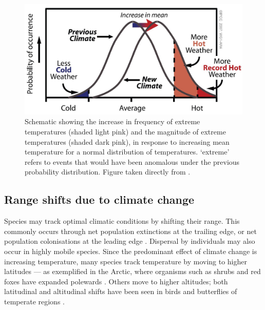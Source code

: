 \documentclass[12pt,a4paper,]{report}
\theoremstyle{definition}
\theoremstyle{definition}
\theoremstyle{definition}
\theoremstyle{remark}
\begin{document}
\begin{figure}
\centering
\includegraphics{figs/Fig1.1.jpg}
\caption{\label{fig:fig-1-1}Schematic showing the increase in frequency of extreme
temperatures (shaded light pink) and the magnitude of extreme
temperatures (shaded dark pink), in response to increasing mean
temperature for a normal distribution of temperatures. `extreme' refers
to events that would have been anomalous under the previous probability
distribution. Figure taken directly from \citet{ipcc_climate2007}.}
\end{figure}

\subsection{Range shifts due to climate
change}\label{range-shifts-due-to-climate-change}

Species may track optimal climatic conditions by shifting their range.
This commonly occurs through net population extinctions at the trailing
edge, or net population colonisations at the leading edge
\citep{parmesan_poleward1999}. Dispersal by individuals may also occur
in highly mobile species. Since the predominant effect of climate change
is increasing temperature, many species track temperature by moving to
higher latitudes --- as exemplified in the Arctic, where organisms such
as shrubs and red foxes have expanded polewards
\citep{hersteinsson_interspecific1992, sturm_climate2001}. Others move
to higher altitudes; both latitudinal and altitudinal shifts have been
seen in birds and butterflies of temperate regions
\citep{hill_responses2002, parmesan_poleward1999, thomas_birds1999}.
\end{document}
